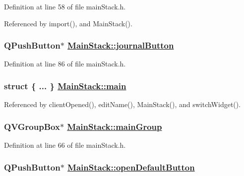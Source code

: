 Definition at line 58 of file main\-Stack.h.

Referenced by import(), and Main\-Stack().\hypertarget{classMainStack_r27}{
\subsubsection[journalButton]{\setlength{\rightskip}{0pt plus 5cm}QPush\-Button$\ast$ \hyperlink{classMainStack_r27}{Main\-Stack::journal\-Button}}}
\label{classMainStack_r27}


Definition at line 86 of file main\-Stack.h.\hypertarget{classMainStack_r17}{
\subsubsection[main]{\setlength{\rightskip}{0pt plus 5cm}struct \{ ... \}   \hyperlink{classMainStack_r17}{Main\-Stack::main}}}
\label{classMainStack_r17}




Referenced by client\-Opened(), edit\-Name(), Main\-Stack(), and switch\-Widget().\hypertarget{classMainStack_r9}{
\subsubsection[mainGroup]{\setlength{\rightskip}{0pt plus 5cm}QVGroup\-Box$\ast$ \hyperlink{classMainStack_r9}{Main\-Stack::main\-Group}}}
\label{classMainStack_r9}


Definition at line 66 of file main\-Stack.h.\hypertarget{classMainStack_r10}{
\subsubsection[openDefaultButton]{\setlength{\rightskip}{0pt plus 5cm}QPush\-Button$\ast$ \hyperlink{classMainStack_r10}{Main\-Stack::open\-Default\-Button}}}
\label{classMainStack_r10}


